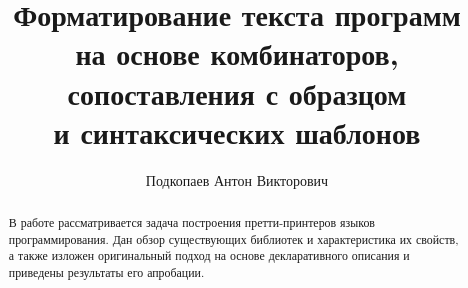 \graphicspath{{Podkopaev/images/}}


\lstset{
	language=llang
}

\title{Форматирование текста программ\\ 
на основе комбинаторов,\\
сопоставления с образцом\\
и синтаксических шаблонов}
%
\author{Подкопаев Антон Викторович}
%
%
%

\maketitle              %

\begin{abstract}
В работе рассматривается задача построения претти-принтеров языков программирования.
Дан обзор существующих библиотек и характеристика их свойств, а также изложен оригинальный 
подход на основе декларативного описания и приведены результаты его апробации.
\end{abstract}
%







